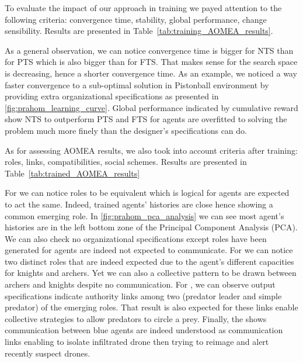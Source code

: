 \documentclass[runningheads]{llncs}
\begin{document}
To evaluate the impact of our approach in training we payed attention to the following criteria: convergence time, stability, global performance, change sensibility. Results are presented in Table~\ref{tab:training_AOMEA_results}.



As a general observation, we can notice convergence time is bigger for NTS than for PTS which is also bigger than for FTS. That makes sense for the search space is decreasing, hence a shorter convergence time. As an example, we noticed a way faster convergence to a sub-optimal solution in Pistonball environment by providing extra organizational specifications as presented in \autoref{fig:prahom_learning_curve}. Global performance indicated by cumulative reward show NTS to outperform PTS and FTS for agents are overfitted to solving the problem much more finely than the designer's specifications can do.

As for assessing AOMEA results, we also took into account criteria after training: roles, links, compatibilities, social schemes. Results are presented in Table~\ref{tab:trained_AOMEA_results}




For  we can notice roles to be equivalent which is logical for agents are expected to act the same. Indeed, trained agents' histories are close hence showing a common emerging role. In \autoref{fig:prahom_pca_analysis} we can see most agent's histories are in the left bottom zone of the Principal Component Analysis (PCA). We can also check no organizational specifications except roles have been generated for agents are indeed not expected to communicate. For  we can notice two distinct roles that are indeed expected due to the agent's different capacities for knights and archers. Yet we can also a collective pattern to be drawn between archers and knights despite no communication. For , we can observe output specifications indicate authority links among two (predator leader and simple predator) of the emerging roles. That result is also expected for these links enable collective strategies to allow predators to circle a prey. Finally, the  shows communication between blue agents are indeed understood as communication links enabling to isolate infiltrated drone then trying to reimage and alert recently suspect drones.
\end{document}
